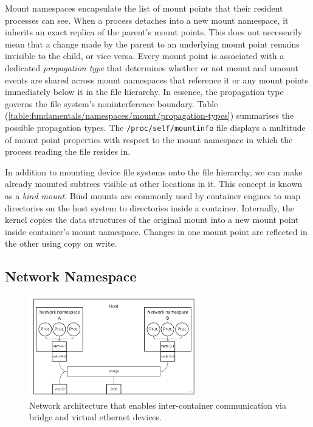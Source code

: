 Mount namespaces encapsulate the list of mount points that their resident processes can 
see. When a process detaches into a new mount namespace, it inherits an exact replica of the parent's mount points.
This does not necessarily mean that a change made by the parent to an underlying mount point remains 
invisible to the child, or vice versa. Every mount point is associated with a dedicated \textit{propagation type} 
that determines whether or not mount and umount events are shared across mount namespaces 
that reference it or any mount points immediately below it in the file hierarchy.  
In essence, the propagation type governs the file system's noninterference boundary. 
Table (\ref{table:fundamentals/namespaces/mount/propagation-types}) summarises the possible 
propagation types. The \verb|/proc/self/mountinfo| file 
displays a multitude of mount point properties with respect to the mount namespace in which 
the process reading the file resides in. 

In addition to mounting device file systems onto the file hierarchy, we can make 
already mounted subtrees visible at other locations in it. This concept is known as a 
\textit{bind mount}. Bind mounts are commonly used by container engines to map directories 
on the host system to directories inside a container. Internally, the kernel copies
the data structures of the original mount into a new mount point inside 
container's mount namespace. Changes in one mount point are reflected in the other 
using copy on write. 

\subsection{Network Namespace}
\label{sections:fundamentals/namespaces/network}
\begin{figure}[H]
    \centering
    \includegraphics[width=0.65\textwidth]{images/fundamentals/net-ns-veth-arch.jpg}
    \caption{Network architecture that enables inter-container communication via bridge and virtual ethernet devices.}
    \label{images:fundamentals/net-ns-veth-arch.jpg}
\end{figure}

